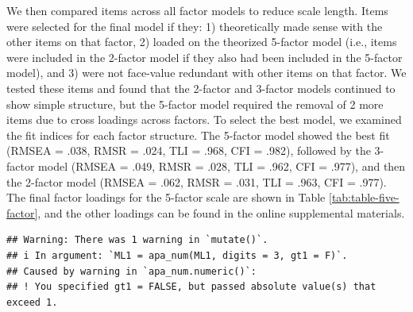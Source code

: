 \documentclass[
  english,
  man]{apa6}
\begin{document}
We then compared items across all factor models to reduce scale length.
Items were selected for the final model if they: 1) theoretically made
sense with the other items on that factor, 2) loaded on the theorized
5-factor model (i.e., items were included in the 2-factor model if they
also had been included in the 5-factor model), and 3) were not
face-value redundant with other items on that factor. We tested these
items and found that the 2-factor and 3-factor models continued to show
simple structure, but the 5-factor model required the removal of
2 more items due to cross
loadings across factors. To select the best model, we examined the fit
indices for each factor structure. The 5-factor model showed the best
fit (RMSEA = .038,
RMSR = .024, TLI =
.968, CFI =
.982), followed by the
3-factor model (RMSEA =
.049, RMSR =
.028, TLI =
.962, CFI =
.977), and then the
2-factor model (RMSEA =
.062, RMSR =
.031, TLI =
.963, CFI =
.977). The final factor
loadings for the 5-factor scale are shown in Table
\ref{tab:table-five-factor}, and the other loadings can be found in the online supplemental materials.

\begin{verbatim}
## Warning: There was 1 warning in `mutate()`.
## i In argument: `ML1 = apa_num(ML1, digits = 3, gt1 = F)`.
## Caused by warning in `apa_num.numeric()`:
## ! You specified gt1 = FALSE, but passed absolute value(s) that exceed 1.
\end{verbatim}
\end{document}
